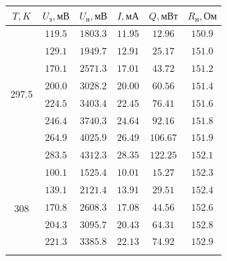 \documentclass[a4paper,12pt]{article}
\begin{document}
\begin{tabular}{|c|c|c|c|c|c|}
  \hline $T, K$ & $U_\text{э}, \text{мВ}$ & $U_{\text{н}}, \text{мВ}$ & $I, \text{мА}$ & $Q, \text{мВт}$ & $R_{\text{н}}, \text{Ом}$ \\\hline
  \multirow{8}{*}{297.5}
                & $119.5$                 & $1803.3$                  & $11.95$        & $12.96$         & $150.9$                   \\\cline{2-6}
                & $129.1$                 & $1949.7$                  & $12.91$        & $25.17$         & $151.0$                   \\\cline{2-6}
                & $170.1$                 & $2571.3$                  & $17.01$        & $43.72$         & $151.2$                   \\\cline{2-6}
                & $200.0$                 & $3028.2$                  & $20.00$        & $60.56$         & $151.4$                   \\\cline{2-6}
                & $224.5$                 & $3403.4$                  & $22.45$        & $76.41$         & $151.6$                   \\\cline{2-6}
                & $246.4$                 & $3740.3$                  & $24.64$        & $92.16$         & $151.8$                   \\\cline{2-6}
                & $264.9$                 & $4025.9$                  & $26.49$        & $106.67$        & $151.9$                   \\\cline{2-6}
                & $283.5$                 & $4312.3$                  & $28.35$        & $122.25$        & $152.1$                   \\\hline
  \multirow{8}{*}{308}
                & $100.1$                 & $1525.4$                  & $10.01$        & $15.27$         & $152.3$                   \\\cline{2-6}
                & $139.1$                 & $2121.4$                  & $13.91$        & $29.51$         & $152.4$                   \\\cline{2-6}
                & $170.8$                 & $2608.3$                  & $17.08$        & $44.56$         & $152.6$                   \\\cline{2-6}
                & $204.3$                 & $3095.7$                  & $20.43$        & $64.31$         & $152.8$                   \\\cline{2-6}
                & $221.3$                 & $3385.8$                  & $22.13$        & $74.92$         & $152.9$                   \\\cline{2-6}

\end{tabular}
\end{document}
